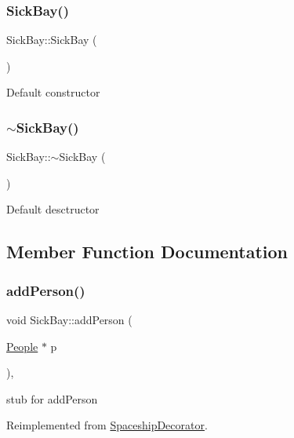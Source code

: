 \subsubsection{\texorpdfstring{Sick\+Bay()}{SickBay()}}
{\footnotesize\ttfamily Sick\+Bay\+::\+Sick\+Bay (\begin{DoxyParamCaption}{ }\end{DoxyParamCaption})}

Default constructor \mbox{\label{classSickBay_a527219ede6b1a75938fef90ecc0b7755}} 
\subsubsection{\texorpdfstring{$\sim$\+Sick\+Bay()}{~SickBay()}}
{\footnotesize\ttfamily Sick\+Bay\+::$\sim$\+Sick\+Bay (\begin{DoxyParamCaption}{ }\end{DoxyParamCaption})}

Default desctructor 

\subsection{Member Function Documentation}
\mbox{\label{classSickBay_a3934a1b821fbd192a946a9aff4575afa}} 
\subsubsection{\texorpdfstring{add\+Person()}{addPerson()}}
{\footnotesize\ttfamily void Sick\+Bay\+::add\+Person (\begin{DoxyParamCaption}\item[{\hyperlink{classPeople}{People} $\ast$}]{p }\end{DoxyParamCaption})\hspace{0.3cm}{\ttfamily [inline]}, {\ttfamily [virtual]}}

stub for add\+Person 

Reimplemented from \hyperlink{classSpaceshipDecorator_a6e289d8a65f35b9f223255ae0eaa3b00}{Spaceship\+Decorator}.

\mbox{\label{classSickBay_aa70415a7714cdd88553f3694b3f2e9e1}} 
